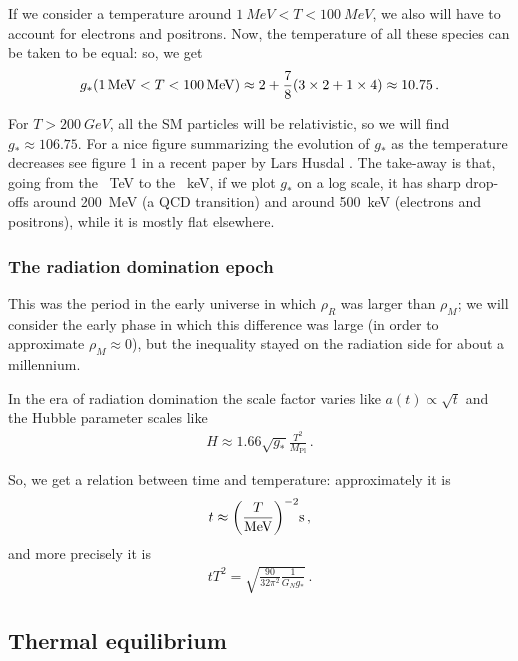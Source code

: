\documentclass[main.tex]{subfiles}
\begin{document}
If we consider a temperature around \(\SI{1}{MeV} < T < \SI{100}{MeV}\), we also will have to account for electrons and positrons. Now, the temperature of all these species can be taken to be equal: so, we get 
%
\begin{align}
g_{*} (\SI{1}{MeV} < T < \SI{100}{MeV}) \approx 2 + \frac{7}{8} \qty(3 \times 2 + 1 \times 4) \approx \num{10.75}
\,.
\end{align}

For \(T > \SI{200}{GeV}\), all the SM particles will be relativistic, so we will find \(g_* \approx \num{106.75}\). 
For a nice figure summarizing the evolution of \(g_*\) as the temperature decreases see figure 1 in a recent paper by Lars Husdal \cite[]{husdalEffectiveDegreesFreedom2016}.
The take-away is that, going from the \SI{}{TeV} to the \SI{}{keV}, if we plot \(g_*\) on a log scale, it has sharp drop-offs around \SI{200}{MeV} (a QCD transition) and around \SI{500}{keV} (electrons and positrons), while it is mostly flat elsewhere.

\subsubsection{The radiation domination epoch}

This was the period in the early universe in which \(\rho_{R} \) was larger than \(\rho_{M}\); we will consider the early phase in which this difference was large (in order to approximate \(\rho_{M} \approx 0\)), but the inequality stayed on the radiation side for about a millennium.

In the era of radiation domination the scale factor varies like 
\(a(t) \propto \sqrt{t} \)
and the Hubble parameter scales like 
\begin{align}
H \approx \num{1.66} \sqrt{g_{*}} \frac{T^2}{M_{\text{Pl}}}
\,.
\end{align}

So, we get a relation between time and temperature: approximately it is 
%
\begin{align}
t \approx \qty( \frac{T}{\SI{}{MeV}})^{-2} \SI{}{s}
\,,
\end{align}
%
and more precisely it is 
%
\begin{align}
t T^2 = \sqrt{ \frac{90}{32 \pi^2} \frac{1}{G_N g_{*}}}
\,.
\end{align}

\subsection{Thermal equilibrium}
\end{document}
